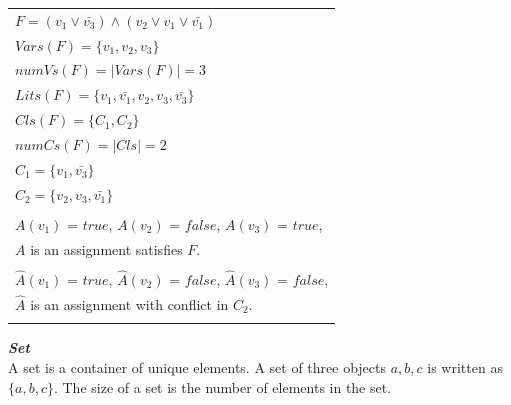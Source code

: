 \documentclass[12pt,a4paper,twoside]{scrartcl}
\numberwithin{equation}{section}
\begin{document}
\begin{center}
\begin{table}[H]
\begin{tabular}{l}
$F = (v_1 \lor \bar{v_3}) \land (v_2 \lor v_1 \lor \bar{v_1})$\\	
$Vars(F) = \{v_1, v_2, v_3\}$\\
$numVs(F) = |Vars(F)| = 3$\\
$Lits(F) = \{v_1, \bar{v_1}, v_2, v_3, \bar{v_3}\}$\\
$Cls(F) = \{C_1, C_2\}$\\
$numCs(F) = |Cls| = 2$\\ 
$C_1 = \{v_1, \bar{v_3}\}$\\
$C_2 = \{v_2, v_3, \bar{v_1}\}$\\
\\
$A(v_1)$ = $true$, $A(v_2)$ = $false$, $A(v_3)$ = $true$, \\
$A$  is an assignment satisfies $F$.\\
\\
$\hat{A}(v_1)$ = $true$, $\hat{A}(v_2)$ = $false$, $\hat{A}(v_3)$ = $false$, \\
$\hat{A}$  is an assignment with conflict in $C_2$.\\
\\
\end{tabular}
\label{table:kysymys}
\end{table}
\end{center}




\emph{\textbf{Set}}\\
A set is a container of unique elements. A set of three objects $ a, b, c$ is written as $\{a, b, c\}$. The
size of a set is the number of elements in the set.
\end{document}
